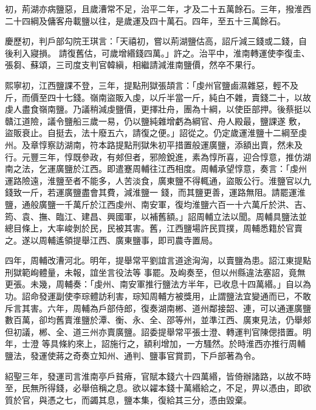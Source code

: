\begin{pinyinscope}
 初，荊湖亦病鹽惡，且歲漕常不足，治平二年，才及二十五萬餘石。三年，撥淮西二十四綱及傭客舟載鹽以往，是歲運及四十萬石。四年，至五十三萬餘石。



 慶歷初，判戶部勾院王琪言：「天禧初，嘗以荊湖鹽估高，詔斤減三錢或二錢，自後利入寢損。
 請復舊估，可歲增緡錢四萬。」許之。治平中，淮南轉運使李復圭、張芻、蘇頌，三司度支判官韓縝，相繼請減淮南鹽價，然卒不果行。



 熙寧初，江西鹽課不登，三年，提點刑獄張頡言：「虔州官鹽鹵濕雜惡，輕不及斤，而價至四十七錢。嶺南盜販入虔，以斤半當一斤，純白不雜，賣錢二十，以故虔人盡食嶺南鹽。乃議稍減虔鹽價，更擇壯舟，團為十綱，以使臣部押。後蔡挺以贛江道險，議令鹽船三歲一易，仍以鹽純雜增虧為綱官、舟人殿最，鹽課遂
 敷，盜販衰止。自挺去，法十廢五六，請復之便。」詔從之。仍定歲運淮鹽十二綱至虔州。及章惇察訪湖南，符本路提點刑獄朱初平措置般運廣鹽，添額出賣，然未及行。元豐三年，惇既參政，有郟但者，邪險銳進，素為惇所喜，迎合惇意，推仿湖南之法，乞運廣鹽於江西。即遣蹇周輔往江西相度。周輔承望惇意，奏言：「虔州運路險遠，淮鹽至者不能多，人苦淡食，廣東鹽不得輒通，盜販公行。淮鹽官以九錢致一斤，若運廣鹽盡會其費，減淮鹽一
 錢，而其鹽更善，運路無阻。請罷運淮鹽，通般廣鹽一千萬斤於江西虔州、南安軍，復均淮鹽六百一十六萬斤於洪、吉、筠、袁、撫、臨江、建昌、興國軍，以補舊額。」詔周輔立法以聞。周輔具鹽法並總目條上，大率峻剝於民，民被其害。舊，江西鹽場許民買撲，周輔悉籍於官賣之。遂以周輔遙領提舉江西、廣東鹽事，即司農寺置局。



 四年，周輔改漕河北。明年，提舉常平劉誼言道途洶洶，以賣鹽為患。詔江東提點刑獄範峋體量，未報，誼坐言役法等
 事罷。及峋奏至，但以州縣違法塞詔，竟無更張。未幾，周輔奏：「虔州、南安軍推行鹽法方半年，已收息十四萬緡。」自以為功。詔命發運副使李琮體訪利害，琮知周輔方被獎用，止謂鹽法宜變通而已，不敢斥言其害。六年，周輔為戶部侍郎，復奏湖南郴、道州鄰接韶、連，可以通運廣鹽數百萬，卻均舊賣淮鹽於潭、衡、永、全、邵等州，並準江西、廣東見法，仍舉郟但初議，郴、全、道三州亦賣廣鹽。詔委提舉常平張士澄、轉運判官陳偲措置。明年，士澄
 等具條約來上，詔施行之，額利增加，一方騷然。於時淮西亦推行周輔鹽法，發運使蔣之奇奏立知州、通判、鹽事官賞罰，下戶部著為令。



 紹聖三年，發運司言淮南亭戶貧瘠，官賦本錢六十四萬緡，皆倚辦諸路，以故不時至，民無所得錢，必舉倍稱之息。欲以糴本錢十萬緡給之，不足，畀以憑由，即欲質於官，與憑之七，而蠲其息，鹽本集，復給其三分，憑由毀棄。




\end{pinyinscope}
